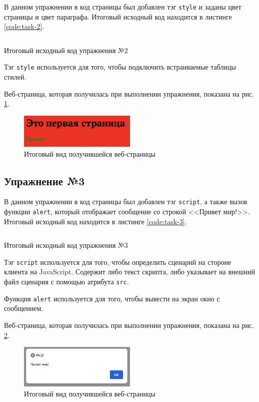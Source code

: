 \documentclass[a4paper, 14pt]{extarticle}
\newenvironment{code}{\captionsetup{type=listing}}{}
\begin{document}
В данном упражнении в код страницы был добавлен тэг \texttt{style} и заданы
цвет страницы и цвет параграфа. Итоговый исходный код находится в листинге
\ref{code:task-2}.

\begin{code}
  \label{code:task-2}
  \inputminted{html}{../task-2/Sample02.html}
  \caption{Итоговый исходный код упражнения №2}
\end{code}

Тэг \texttt{style} используется для того, чтобы подключить встраиваемые таблицы
стилей.

Веб-страница, которая получилась при выполнении упражнения, показана на рис.
\ref{fig:task-2}.

\begin{figure}[H]
  \centering
  \includegraphics[width=0.5\textwidth]{images/task-2.png}
  \caption{Итоговый вид получившейся веб-страницы}
  \label{fig:task-2}
\end{figure}

\subsection{Упражнение №3}

В данном упражнении в код страницы был добавлен тэг \texttt{script}, а также
вызов функции \texttt{alert}, который отображает сообщение со строкой <<Привет
мир!>>. Итоговый исходный код находится в листинге \ref{code:task-3}.

\begin{code}
  \label{code:task-3}
  \inputminted{html}{../task-3/Sample03.html}
  \caption{Итоговый исходный код упражнения №3}
\end{code}

Тэг \texttt{script} используется для того, чтобы определить сценарий на стороне
клиента на JavaScript. Содержит либо текст скрипта, либо указывает на внешний
файл сценария с помощью атрибута \texttt{src}.

Функция \texttt{alert} используется для того, чтобы вывести на экран окно с
сообщением.

Веб-страница, которая получилась при выполнении упражнения, показана на рис.
\ref{fig:task-3}.

\begin{figure}[H]
  \centering
  \includegraphics[width=0.5\textwidth]{images/task-3.png}
  \caption{Итоговый вид получившейся веб-страницы}
  \label{fig:task-3}
\end{figure}
\end{document}
